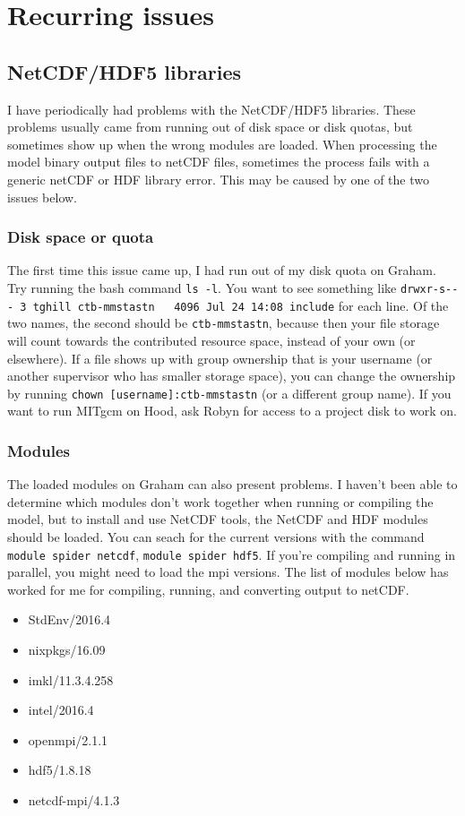 \documentclass[11pt]{article}
\begin{document}
\section{Recurring issues}

\subsection{NetCDF/HDF5 libraries}
I have periodically had problems with the NetCDF/HDF5 libraries. These problems usually came from running out of disk space or disk quotas, but sometimes show up when the wrong modules are loaded. When processing the model binary output files to netCDF files, sometimes the process fails with a generic netCDF or HDF library error. This may be caused by one of the two issues below.

\subsubsection{Disk space or quota}
The first time this issue came up, I had run out of my disk quota on Graham. Try running the bash command \verb|ls -l|. You want to see something like \verb|drwxr-s--- 3 tghill ctb-mmstastn   4096 Jul 24 14:08 include| for each line. Of the two names, the second should be \verb|ctb-mmstastn|, because then your file storage will count towards the contributed resource space, instead of your own (or elsewhere). If a file shows up with group ownership that is your username (or another supervisor who has smaller storage space), you can change the ownership by running \verb|chown [username]:ctb-mmstastn| (or a different group name). If you want to run MITgcm on Hood, ask Robyn for access to a project disk to work on.

\subsubsection{Modules}
The loaded modules on Graham can also present problems. I haven't been able to determine which modules don't work together when running or compiling the model, but to install and use NetCDF tools, the NetCDF and HDF modules should be loaded. You can seach for the current versions with  the command \verb|module spider netcdf|, \verb|module spider hdf5|. If you're compiling and running in parallel, you might need to load the mpi versions. The list of modules below has worked for me for compiling, running, and converting output to netCDF.

\begin{itemize}
\item{StdEnv/2016.4}
\item{nixpkgs/16.09}
\item{imkl/11.3.4.258}
\item{intel/2016.4}
\item{openmpi/2.1.1}
\item{hdf5/1.8.18}
\item{netcdf-mpi/4.1.3}
\end{itemize}
\end{document}
